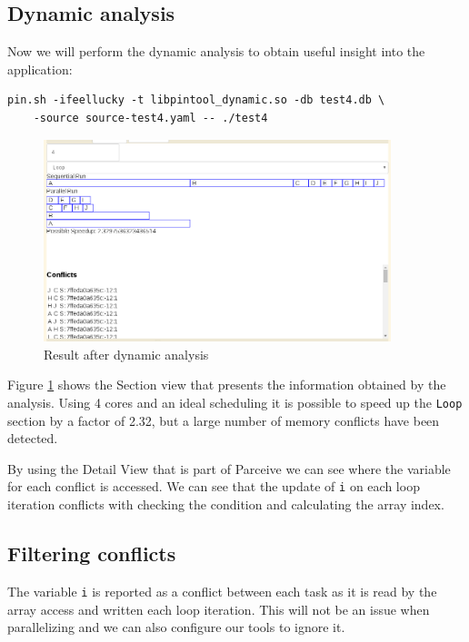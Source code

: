 \subsection{Dynamic analysis}

Now we will perform the dynamic analysis to obtain useful insight into the application:

\begin{lstlisting}[style=BashInputStyle]
pin.sh -ifeellucky -t libpintool_dynamic.so -db test4.db \
	-source source-test4.yaml -- ./test4
\end{lstlisting}

\begin{figure}[!ht]
	\centering
	\includegraphics[width=0.9\textwidth]{simple-run1}
	\caption{Result after dynamic analysis}
	\label{cap1:example:code-run1}
\end{figure}

Figure \ref{cap1:example:code-run1} shows the Section view that presents the information obtained by the analysis. Using 4 cores and an ideal scheduling it is possible to speed up the \texttt{Loop} section by a factor of 2.32, but a large number of memory conflicts have been detected.

By using the Detail View that is part of Parceive we can see where the variable for each conflict is accessed. We can see that the update of \texttt{i} on each loop iteration conflicts with checking the condition and calculating the array index.

\subsection{Filtering conflicts}

The variable \texttt{i} is reported as a conflict between each task as it is read by the array access and written each loop iteration. This will not be an issue when parallelizing and we can also configure our tools to ignore it.

